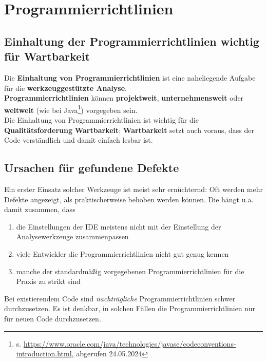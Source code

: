 \section{Programmierrichtlinien}\label{sec:programmierrichtlinien}

\subsection*{Einhaltung der Programmierrichtlinien wichtig für Wartbarkeit}

Die \textbf{Einhaltung von Programmierrichtlinien} ist eine naheliegende Aufgabe für die \textbf{werkzeuggestützte Analyse}.\\
\textbf{Programmierrichtlinien} können \textbf{projektweit}, \textbf{unternehmensweit} oder \textbf{weltweit} (wie bei Java\footnote{
s. \url{https://www.oracle.com/java/technologies/javase/codeconventions-introduction.html}, abgerufen 24.05.2024
}) vorgegeben sein.\\

\noindent
Die Einhaltung von Programmierrichtlinien ist wichtig für die \textbf{Qualitätsforderung} \textbf{Wartbarkeit}: \textbf{Wartbarkeit} setzt auch voraus, dass der Code verständlich und damit einfach lesbar ist.

\subsection*{Ursachen für gefundene Defekte}
Ein erster Einsatz solcher Werkzeuge ist meist sehr ernüchternd: Oft werden mehr Defekte angezeigt, als praktischerweise behoben werden können.
Die hängt u.a. damit zusammen, dass

\begin{enumerate}
    \item die Einstellungen der IDE meistens nicht mit der Einstellung der Analysewerkzeuge zusammenpassen
    \item viele Entwickler die Programmierrichtlinien nicht gut genug kennen
    \item manche der standardmäßig vorgegebenen Programmierrichtlinien für die Praxis zu strikt sind
\end{enumerate}

\noindent
Bei existierendem Code sind \textit{nachträgliche} Programmierrichtlinien schwer durchzusetzen.
Es ist denkbar, in solchen Fällen die Programmierrichtlinien nur für neuen Code durchzusetzen.

